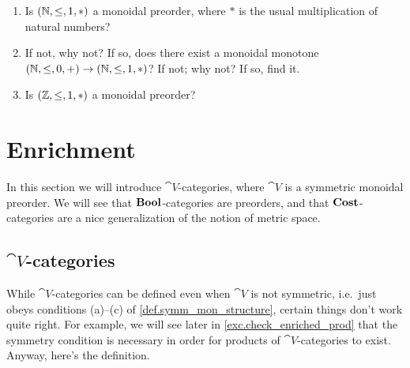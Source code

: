 \documentclass[7Sketches]{subfiles}
\begin{document}
\begin{exercise}%
\label{exc.natural_monotone}
\begin{enumerate}
	\item Is $(\mathbb{N},\leq,1,*)$ a monoidal preorder, where $*$ is the usual multiplication of natural numbers?
	\item If not, why not? If so, does there exist a monoidal monotone $(\mathbb{N},\leq,0,+)\to(\mathbb{N},\leq,1,*)$? If not; why not? If so, find it.
	\item Is $(\mathbb{Z},\leq,1,*)$ a monoidal preorder?
\qedhere
\end{enumerate}
\end{exercise}

%
%

\section{Enrichment}%
\label{sec.enrichment}%

In this section we will introduce $\cat{V}$-categories, where $\cat{V}$ is a
symmetric monoidal preorder. We will see that $\mathbf{Bool}$-categories are preorders, and
that $\mathbf{Cost}$-categories are a nice generalization of the notion of metric space.

\subsection{$\cat{V}$-categories}%
\label{subsec.V_cats}%

While $\cat{V}$-categories can be defined even when $\cat{V}$ is not symmetric,
i.e.\ just obeys conditions (a)--(c) of \cref{def.symm_mon_structure}, certain things don't work quite right. For example, we will see later in \cref{exc.check_enriched_prod} that the symmetry condition is necessary in order for products of $\cat{V}$-categories to exist. Anyway, here's the definition.
\end{document}
